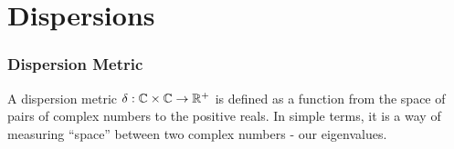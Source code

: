 

\section{Dispersions}
\begin{frame} \frametitle{Dispersion Metric}

\begin{alertblock}{}
A dispersion metric $\delta: \mathbb{C} \times \mathbb{C} \to \mathbb{R}^+$ is defined as a function from the space of pairs of complex numbers to the positive reals.
In simple terms, it is a way of measuring ``space'' between two complex numbers - our eigenvalues.
\end{alertblock}

\end{frame}

